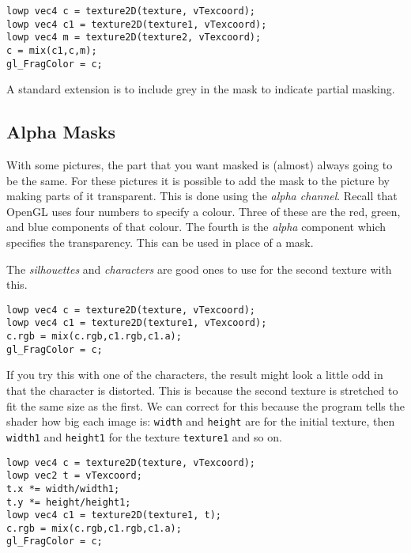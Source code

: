 \documentclass[
  html5,%
  mathml,%
  use filename%
]{internet}
\begin{document}
\begin{tcolorbox}
\begin{verbatim}
lowp vec4 c = texture2D(texture, vTexcoord);
lowp vec4 c1 = texture2D(texture1, vTexcoord);
lowp vec4 m = texture2D(texture2, vTexcoord);
c = mix(c1,c,m);
gl_FragColor = c;
\end{verbatim}
\end{tcolorbox}

A standard extension is to include grey in the mask to indicate partial masking. 

\subsection{Alpha Masks}

With some pictures, the part that you want masked is (almost) always going to be the same.
For these pictures it is possible to add the mask to the picture by making parts of it transparent.
This is done using the \emph{alpha channel}.
Recall that OpenGL uses four numbers to specify a colour.
Three of these are the red, green, and blue components of that colour.
The fourth is the \emph{alpha} component which specifies the transparency.
This can be used in place of a mask.

The \emph{silhouettes} and \emph{characters} are good ones to use for the second texture with this.

\begin{tcolorbox}
\begin{verbatim}
lowp vec4 c = texture2D(texture, vTexcoord);
lowp vec4 c1 = texture2D(texture1, vTexcoord);
c.rgb = mix(c.rgb,c1.rgb,c1.a);
gl_FragColor = c;
\end{verbatim}
\end{tcolorbox}

If you try this with one of the characters, the result might look a little odd in that the character is distorted.
This is because the second texture is stretched to fit the same size as the first.
We can correct for this because the program tells the shader how big each image is: \verb+width+ and \verb+height+ are for the initial texture, then \verb+width1+ and \verb+height1+ for the texture \verb+texture1+ and so on. 


\begin{tcolorbox}
\begin{verbatim}
lowp vec4 c = texture2D(texture, vTexcoord);
lowp vec2 t = vTexcoord;
t.x *= width/width1;
t.y *= height/height1;
lowp vec4 c1 = texture2D(texture1, t);
c.rgb = mix(c.rgb,c1.rgb,c1.a);
gl_FragColor = c;
\end{verbatim}
\end{tcolorbox}
\end{document}
